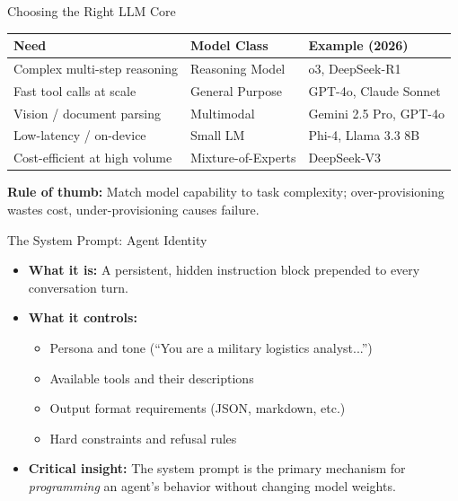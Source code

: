 \documentclass{beamer}       %
\begin{document}
\begin{frame}{Choosing the Right LLM Core}
    \small
    \begin{table}[]
        \centering
        \begin{tabular}{@{}lll@{}}
            \toprule
            \textbf{Need} & \textbf{Model Class} & \textbf{Example (2026)} \\ \midrule
            Complex multi-step reasoning  & Reasoning Model   & o3, DeepSeek-R1 \\
            Fast tool calls at scale      & General Purpose   & GPT-4o, Claude Sonnet \\
            Vision / document parsing     & Multimodal        & Gemini 2.5 Pro, GPT-4o \\
            Low-latency / on-device       & Small LM          & Phi-4, Llama 3.3 8B \\
            Cost-efficient at high volume & Mixture-of-Experts & DeepSeek-V3 \\
            \bottomrule
        \end{tabular}
    \end{table}
    \vspace{0.2cm}
    \textbf{Rule of thumb:} Match model capability to task complexity; over-provisioning wastes cost, under-provisioning causes failure.
\end{frame}

\begin{frame}{The System Prompt: Agent Identity}
    \begin{itemize}
        \item \textbf{What it is:} A persistent, hidden instruction block prepended to every conversation turn.
        \item \textbf{What it controls:}
            \begin{itemize}
                \item Persona and tone (``You are a military logistics analyst...'')
                \item Available tools and their descriptions
                \item Output format requirements (JSON, markdown, etc.)
                \item Hard constraints and refusal rules
            \end{itemize}
        \item \textbf{Critical insight:} The system prompt is the primary mechanism for \emph{programming} an agent's behavior without changing model weights.
    \end{itemize}
\end{frame}
\end{document}
